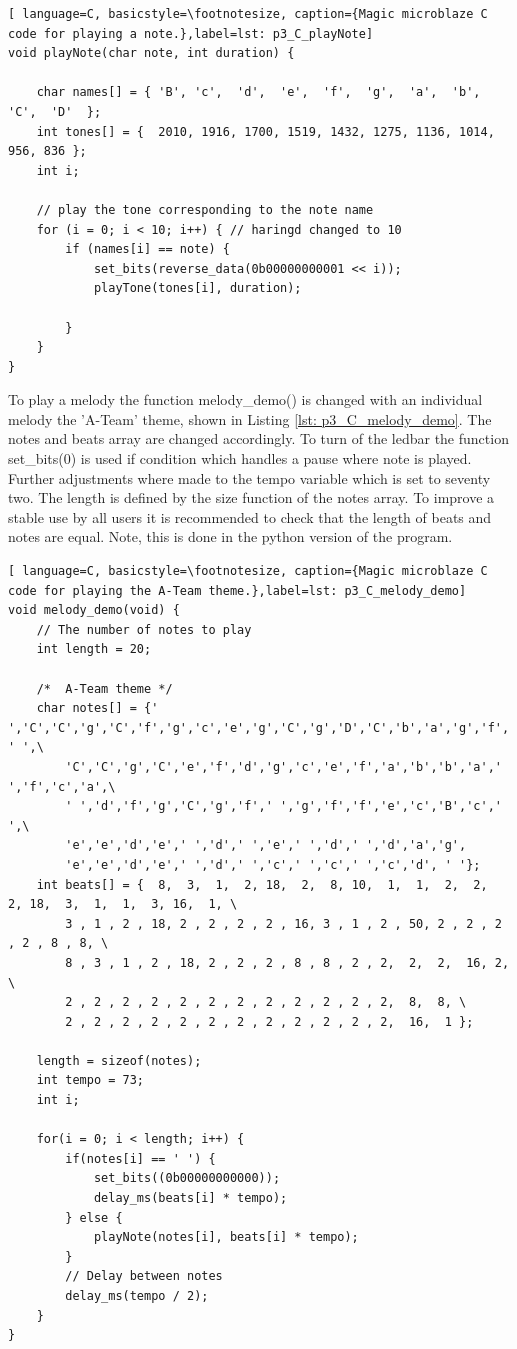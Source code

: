 \begin{lstlisting}[ language=C, basicstyle=\footnotesize, caption={Magic microblaze C code for playing a note.},label=lst: p3_C_playNote]
void playNote(char note, int duration) {
	
	char names[] = { 'B', 'c',  'd',  'e',  'f',  'g',  'a',  'b', 'C',  'D'  };
	int tones[] = {  2010, 1916, 1700, 1519, 1432, 1275, 1136, 1014, 956, 836 };
	int i;
	
	// play the tone corresponding to the note name
	for (i = 0; i < 10; i++) { // haringd changed to 10
		if (names[i] == note) {
			set_bits(reverse_data(0b00000000001 << i));
			playTone(tones[i], duration);
			
		}
	}
}
\end{lstlisting}

To play a melody the function melody\_demo() is changed with an individual melody the 'A-Team' theme, shown in Listing \ref{lst: p3_C_melody_demo}. The notes and beats array are changed accordingly. To turn of the ledbar the function set\_bits(0) is used if condition which handles a pause where note is played. Further adjustments where made to the tempo variable which is set to seventy two. The length is defined by the size function of the notes array. To improve a stable use by all users it is recommended to check that the length of beats and notes are equal. Note, this is done in the python version of the program.

\begin{lstlisting}[ language=C, basicstyle=\footnotesize, caption={Magic microblaze C code for playing the A-Team theme.},label=lst: p3_C_melody_demo]
void melody_demo(void) {
	// The number of notes to play
	int length = 20;

	/*  A-Team theme */
	char notes[] = {' ','C','C','g','C','f','g','c','e','g','C','g','D','C','b','a','g','f','g', ' ',\
		'C','C','g','C','e','f','d','g','c','e','f','a','b','b','a',' ','f','c','a',\
		' ','d','f','g','C','g','f',' ','g','f','f','e','c','B','c',' ',\
		'e','e','d','e',' ','d',' ','e',' ','d',' ','d','a','g',
		'e','e','d','e',' ','d',' ','c',' ','c',' ','c','d', ' '};
	int beats[] = {  8,  3,  1,  2, 18,  2,  8, 10,  1,  1,  2,  2,  2, 18,  3,  1,  1,  3, 16,  1, \ 
		3 , 1 , 2 , 18, 2 , 2 , 2 , 2 , 16, 3 , 1 , 2 , 50, 2 , 2 , 2 , 2 , 8 , 8, \
		8 , 3 , 1 , 2 , 18, 2 , 2 , 2 , 8 , 8 , 2 , 2,  2,  2,  16, 2, \
		2 , 2 , 2 , 2 , 2 , 2 , 2 , 2 , 2 , 2 , 2 , 2,  8,  8, \
		2 , 2 , 2 , 2 , 2 , 2 , 2 , 2 , 2 , 2 , 2 , 2,  16,  1 };

	length = sizeof(notes);
	int tempo = 73;
	int i;
	
	for(i = 0; i < length; i++) {
		if(notes[i] == ' ') {
			set_bits((0b00000000000));
			delay_ms(beats[i] * tempo);
		} else {
			playNote(notes[i], beats[i] * tempo);
		}
		// Delay between notes
		delay_ms(tempo / 2);
	}
}
\end{lstlisting}

